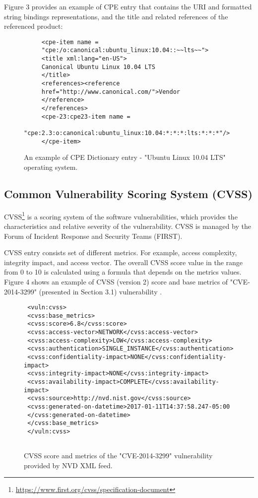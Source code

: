 \documentclass{llncs}
\begin{document}
  \par
  Figure 3 provides an example of CPE entry that contains the URI and formatted string bindings  representations, and the title and related references of the referenced product: 
  
  \begin{figure}
   
     \lstset{language=XML}
      \begin{lstlisting}
     <cpe-item name =
     "cpe:/o:canonical:ubuntu_linux:10.04::~~lts~~">
     <title xml:lang="en-US">
     Canonical Ubuntu Linux 10.04 LTS
     </title>
     <references><reference 
     href="http://www.canonical.com/">Vendor
     </reference>
     </references>
     <cpe-23:cpe23-item name =
    "cpe:2.3:o:canonical:ubuntu_linux:10.04:*:*:*:lts:*:*:*"/>
     </cpe-item>
      \end{lstlisting}
     \caption{An example of CPE Dictionary entry - "Ubuntu Linux 10.04 LTS" operating system.}
      \end{figure}
  
  
 \subsection{Common Vulnerability Scoring System (CVSS)}
 
 \par CVSS\footnote{\url{https://www.first.org/cvss/specification-document}} is a scoring system of the software  vulnerabilities, which provides the characteristics and relative severity of the vulnerability. CVSS is managed by the Forum of Incident Response and Security Teams (FIRST).
 
 \par CVSS entry consists set of different metrics. For example, access complexity, integrity impact, and access vector. The overall CVSS score value in the range from 0 to 10  is calculated using a formula that depends on the metrics values. Figure 4 shows an example of CVSS (version 2) score and  base metrics of "CVE-2014-3299" (presented in Section 3.1) vulnerability .
 
 \begin{figure}
    \centering
      \lstset{language=XML}
       \begin{lstlisting}
 <vuln:cvss>
 <cvss:base_metrics>
 <cvss:score>6.8</cvss:score>
 <cvss:access-vector>NETWORK</cvss:access-vector>
 <cvss:access-complexity>LOW</cvss:access-complexity>
 <cvss:authentication>SINGLE_INSTANCE</cvss:authentication>
 <cvss:confidentiality-impact>NONE</cvss:confidentiality-impact>
 <cvss:integrity-impact>NONE</cvss:integrity-impact>
 <cvss:availability-impact>COMPLETE</cvss:availability-impact>
 <cvss:source>http://nvd.nist.gov</cvss:source>
 <cvss:generated-on-datetime>2017-01-11T14:37:58.247-05:00
 </cvss:generated-on-datetime>
 </cvss:base_metrics>
 </vuln:cvss>
 
       \end{lstlisting}
      \caption{CVSS score and metrics of the "CVE-2014-3299" vulnerability provided by NVD XML feed.}
       \end{figure}
\end{document}

